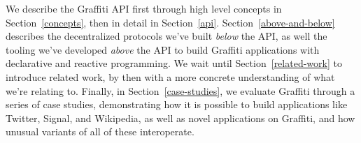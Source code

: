 We describe the Graffiti API
first through high level concepts in Section~\ref{concepts},
then in detail in Section~\ref{api}.
Section~\ref{above-and-below} describes
the decentralized protocols we've built \emph{below} the API,
as well the tooling we've developed \emph{above} the API
to build Graffiti applications with declarative and reactive programming.
We wait until Section~\ref{related-work}
to introduce related work, by then with a more concrete
understanding of what we're relating to.
Finally, in Section~\ref{case-studies},
we evaluate Graffiti through a series of case studies, demonstrating
how it is possible to build applications like Twitter, Signal, and
Wikipedia, as well as novel applications on Graffiti, and how unusual
variants of all of these interoperate.







